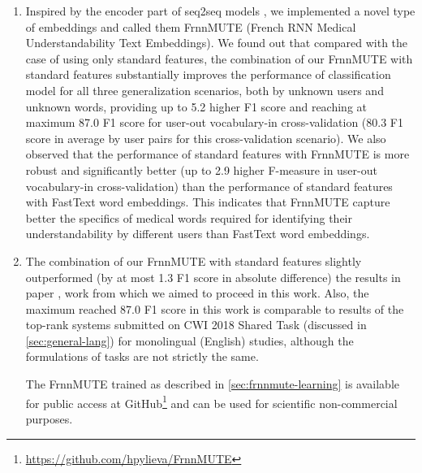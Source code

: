 \begin{enumerate}[listparindent=1.5em]
    These results of applying FastText word embeddings for automatic word categorization on data from three annotators were published and presented on 1st International Workshop on Informatics \& Data-Driven Medicine\footnote{\url{http://science.lpnu.ua/iddm-2018}} \citep{Pylieva:2018}.
    
    \item Inspired by the encoder part of seq2seq models \citep{Sutskever-NIPS2014}, we implemented a novel type of embeddings and called them FrnnMUTE (French RNN Medical Understandability Text Embeddings). We found out that compared with the case of using only standard features, the combination of our FrnnMUTE with standard features substantially improves the performance of classification model for all three generalization scenarios, both by unknown users and unknown words,  providing up to 5.2 higher F1 score and reaching at maximum 87.0 F1 score for user-out vocabulary-in cross-validation (80.3 F1 score in average by user pairs for this cross-validation scenario). We also observed that the performance of standard features with FrnnMUTE is more robust and significantly better (up to 2.9 higher F-measure in user-out vocabulary-in cross-validation) than the performance of standard features with FastText word embeddings. This indicates that FrnnMUTE capture better the specifics of medical words required for identifying their understandability by different users than FastText word embeddings. 
    
    \item The combination of our FrnnMUTE with standard features slightly outperformed (by at most 1.3 F1 score in absolute difference) the results in paper \citep{Grabar-PITR2014}, work from which we aimed to proceed in this work.  Also, the maximum reached 87.0 F1 score in this work is comparable to results of the top-rank systems submitted on CWI 2018 Shared Task (discussed in \ref{sec:general-lang}) for monolingual (English) studies, although the formulations of tasks are not strictly the same.
    
    The FrnnMUTE trained as described in \ref{sec:frnnmute-learning} is available for public access at GitHub\footnote{\url{https://github.com/hpylieva/FrnnMUTE}} and can be used for scientific non-commercial purposes.
\end{enumerate}

